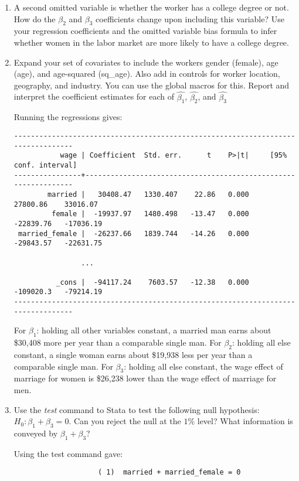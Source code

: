 \documentclass[11pt,twoside,openany]{memoir}
\begin{document}
\begin{question}
\begin{enumerate}[label = (\alph*),itemsep=1pt,topsep=3pt]
        \item A second omitted variable is whether the worker has a college degree or not. How do the $\beta_2$ and $\beta_3$ coefficients change upon including this variable? Use your regression coefficients and the omitted variable bias formula to infer whether women in the labor market are more likely to have a college degree.
            {\color{blue} \begin{solution}
                
            \end{solution}}

        \item Expand your set of covariates to include the workers gender (female), age (age), and age-squared (sq\_age). Also add in controls for worker location, geography, and industry. You can use the global macros for this. Report and interpret the coefficient estimates for each of $\widehat{\beta_1}$, $\widehat{\beta_2}$, and $\widehat{\beta_3}$
            {\color{blue} \begin{solution}
                Running the regressions gives:
                \begin{Verbatim}
---------------------------------------------------------------------------------
           wage | Coefficient  Std. err.      t    P>|t|     [95% conf. interval]
----------------+----------------------------------------------------------------
        married |   30408.47   1330.407    22.86   0.000     27800.86    33016.07
         female |  -19937.97   1480.498   -13.47   0.000    -22839.76   -17036.19
 married_female |  -26237.66   1839.744   -14.26   0.000    -29843.57   -22631.75

                ...

          _cons |  -94117.24    7603.57   -12.38   0.000    -109020.3   -79214.19
---------------------------------------------------------------------------------
                \end{Verbatim}     
                For $\beta_1$: holding all other variables constant, a married man earns about \$30,408 more per year than a comparable single man. For $\beta_2$: holding all else constant, a single woman earns about \$19,938 less per year than a comparable single man. For $\beta_3$: holding all else constant, the wage effect of marriage for women is \$26,238 lower than the wage effect of marriage for men.
            \end{solution}}

        
        \item Use the \textit{test} command to Stata to test the following null hypothesis: $H_0: \beta_1 + \beta_3 = 0$. Can you reject the null at the $1\%$ level? What information is conveyed by $\beta_1 + \beta_3$?
            {\color{blue} \begin{solution}
                Using the test command gave:
                \begin{Verbatim}
                    ( 1)  married + married_female = 0


\end{Verbatim}
\end{solution}}
\end{enumerate}
\end{question}
\end{document}
